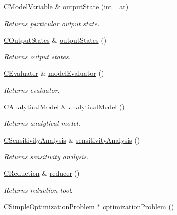 \begin{DoxyCompactItemize}
\hyperlink{class_go_s_u_m_1_1_c_model_variable}{C\-Model\-Variable} \& \hyperlink{class_go_s_u_m_1_1_c_container_a53f245e7a0e82a445b282c18289c16b7}{output\-State} (int \-\_\-at)
\begin{DoxyCompactList}\small\item\em Returns particular output state. \end{DoxyCompactList}\item 
\hyperlink{class_go_s_u_m_1_1_c_output_states}{C\-Output\-States} \& \hyperlink{class_go_s_u_m_1_1_c_container_a63309726c2f7ff3b3bc1f19fee0a7aa5}{output\-States} ()
\begin{DoxyCompactList}\small\item\em Returns output states. \end{DoxyCompactList}\item 
\hyperlink{class_go_s_u_m_1_1_c_evaluator}{C\-Evaluator} \& \hyperlink{class_go_s_u_m_1_1_c_container_abfcaff8dac0f87d13ee010acc1127dd5}{model\-Evaluator} ()
\begin{DoxyCompactList}\small\item\em Returns evaluator. \end{DoxyCompactList}\item 
\hyperlink{class_go_s_u_m_1_1_c_analytical_model}{C\-Analytical\-Model} \& \hyperlink{class_go_s_u_m_1_1_c_container_afbf4b9d666f45853c817f623a356390e}{analytical\-Model} ()
\begin{DoxyCompactList}\small\item\em Returns analytical model. \end{DoxyCompactList}\item 
\hyperlink{class_go_s_u_m_1_1_c_sensitivity_analysis}{C\-Sensitivity\-Analysis} \& \hyperlink{class_go_s_u_m_1_1_c_container_a9f5cbdedea1f310554d3fc75c5139fd8}{sensitivity\-Analysis} ()
\begin{DoxyCompactList}\small\item\em Returns sensitivity analysis. \end{DoxyCompactList}\item 
\hyperlink{class_go_s_u_m_1_1_c_reduction}{C\-Reduction} \& \hyperlink{class_go_s_u_m_1_1_c_container_a75766ed932584c790cf0693091ba1933}{reducer} ()
\begin{DoxyCompactList}\small\item\em Returns reduction tool. \end{DoxyCompactList}\item 
\hyperlink{class_go_s_u_m_1_1_c_simple_optimization_problem}{C\-Simple\-Optimization\-Problem} $\ast$ \hyperlink{class_go_s_u_m_1_1_c_container_a2abf77f71b45ada3e038cfce7ad77b4b}{optimization\-Problem} ()

\end{DoxyCompactItemize}
